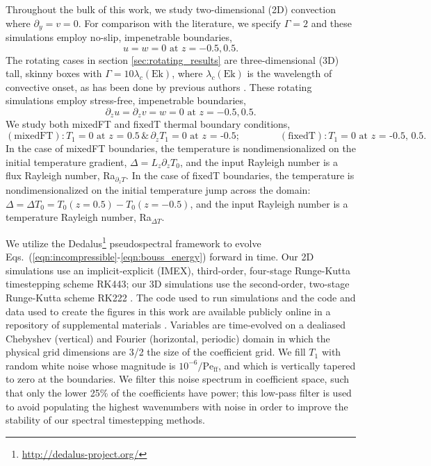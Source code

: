 \documentclass[aps, pre, onecolumn, nofootinbib, notitlepage, groupedaddress, amsfonts, amssymb, amsmath, longbibliography]{revtex4-1}
\newcommand{\Peff}{\ensuremath{\text{Pe}_{\text{ff}}}}
\begin{document}
Throughout the bulk of this work, we study two-dimensional (2D) convection where $\partial_y = v = 0$.
For comparison with the literature, we specify $\Gamma = 2$ and these simulations employ no-slip, impenetrable boundaries,
\begin{equation}
u = w = 0 \, \, \text{at}\,\,z = -0.5, 0.5.
\label{eqn:vel_bcs}
\end{equation}
The rotating cases in section \ref{sec:rotating_results} are three-dimensional (3D) tall, skinny boxes with $\Gamma = 10\lambda_c(\text{Ek})$, where $\lambda_c(\text{Ek})$ is the wavelength of convective onset, as has been done by previous authors \cite{stellmach&all2014}. 
These rotating simulations employ stress-free, impenetrable boundaries,
\begin{equation}
\partial_z u = \partial_z v = w = 0 \, \, \text{at}\,\,z = -0.5, 0.5.
\label{eqn:vel_bcs}
\end{equation}
We study both mixedFT and fixedT thermal boundary conditions,
\begin{equation}
(\text{mixedFT}): T_1 = 0 \text{ at $z$ = 0.5} \,\&\, \partial_z T_1 = 0 \text{ at $z$ = -0.5};\qquad\qquad
(\text{fixedT}): T_1 = 0 \text{ at $z$ = -0.5, 0.5}.
\end{equation}
In the case of mixedFT boundaries, the temperature is nondimensionalized on the initial temperature gradient, $\Delta = L_z \partial_z T_0$, and the input Rayleigh number is a flux Rayleigh number, Ra$_{\partial_z T}$.
In the case of fixedT boundaries, the temperature is nondimensionalized on the initial temperature jump across the domain: $\Delta = \Delta T_0 =  T_0(z=0.5)-T_0(z=-0.5)$, and the input Rayleigh number is a temperature Rayleigh number, Ra$_{\Delta T}$.

We utilize the Dedalus\footnote{\url{http://dedalus-project.org/}} pseudospectral framework \cite{burns&all2016, burns&all2019} to evolve Eqs.~(\ref{eqn:incompressible}-\ref{eqn:bouss_energy}) forward in time.
Our 2D simulations use an implicit-explicit (IMEX), third-order, four-stage Runge-Kutta timestepping scheme RK443; our 3D simulations use the second-order, two-stage Runge-Kutta scheme RK222 \cite{ascher&all1997}. 
The code used to run simulations and the code and data used to create the figures in this work are available publicly online in a repository of supplemental materials \cite{anders&all2020a_supp}.
Variables are time-evolved on a dealiased Chebyshev (vertical) and Fourier (horizontal, periodic) domain in which the physical grid dimensions are 3/2 the size of the coefficient grid.  
We fill $T_1$ with random white noise whose magnitude is $10^{-6}/\Peff$, and which is vertically tapered to zero at the boundaries.
We filter this noise spectrum in coefficient space, such that only the lower 25\% of the coefficients have power; this low-pass filter is used to avoid populating the highest wavenumbers with noise in order to improve the stability of our spectral timestepping methods.
\end{document}
